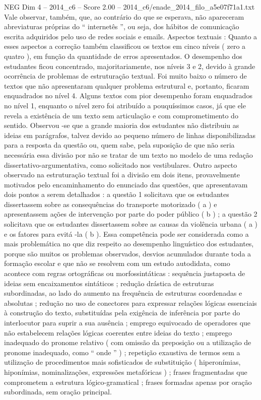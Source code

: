 \begin{textsample}{NEG Dim 4 – 2014\_c6 – Score 2.00 – 2014\_c6/enade\_2014\_filo\_a5e07f71a1.txt}
Vale observar, também, que, ao contrário do que se esperava, não apareceram abreviaturas próprias do “ internetês ”, ou seja, dos hábitos de comunicação escrita adquiridos pelo uso de redes sociais e emails.
Aspectos textuais : Quanto a esses aspectos a correção também classificou os textos em cinco níveis ( zero a quatro ), em função da quantidade de erros apresentados.
O desempenho dos estudantes ficou concentrado, majoritariamente, nos níveis 3 e 2, devido à grande ocorrência de problemas de estruturação textual.
Foi muito baixo o número de textos que não apresentaram qualquer problema estrutural e, portanto, ficaram enquadrados no nível 4.
Alguns textos com pior desempenho foram enquadrados no nível 1, enquanto o nível zero foi atribuído a pouquíssimos casos, já que ele revela a existência de um texto sem articulação e com comprometimento do sentido.
Observou -se que a grande maioria dos estudantes não distribuiu as ideias em parágrafos, talvez devido ao pequeno número de linhas disponibilizadas para a resposta da questão ou, quem sabe, pela suposição de que não seria necessária essa divisão por não se tratar de um texto no modelo de uma redação dissertativo-argumentativa, como solicitado nos vestibulares.
Outro aspecto observado na estruturação textual foi a divisão em dois itens, provavelmente motivados pelo encaminhamento do enunciado das questões, que apresentavam dois pontos a serem detalhados : a questão 1 solicitava que os estudantes dissertassem sobre as consequências do transporte motorizado ( a ) e apresentassem ações de intervenção por parte do poder público ( b ) ; a questão 2 solicitava que os estudantes dissertassem sobre as causas da violência urbana ( a ) e os fatores para evitá -la ( b ).
Essa competência pode ser considerada como a mais problemática no que diz respeito ao desempenho linguístico dos estudantes, porque são muitos os problemas observados, desvios acumulados durante toda a formação escolar e que não se resolvem com um estudo autodidata, como acontece com regras ortográficas ou morfossintáticas : sequência justaposta de ideias sem encaixamentos sintáticos ; redução drástica de estruturas subordinadas, ao lado do aumento na frequência de estruturas coordenadas e absolutas ; redução no uso de conectores para expressar relações lógicas essenciais à construção do texto, substituídas pela exigência de inferência por parte do interlocutor para suprir a sua ausência ; emprego equivocado de operadores que não estabelecem relações lógicas coerentes entre ideias do texto ; emprego inadequado do pronome relativo ( com omissão da preposição ou a utilização de pronome inadequado, como “ onde ” ) ; repetição exaustiva de termos sem a utilização de procedimentos mais sofisticados de substituição ( hiperonímias, hiponímias, nominalizações, expressões metafóricas ) ; frases fragmentadas que comprometem a estrutura lógico-gramatical ; frases formadas apenas por oração subordinada, sem oração principal.

\end{textsample}
